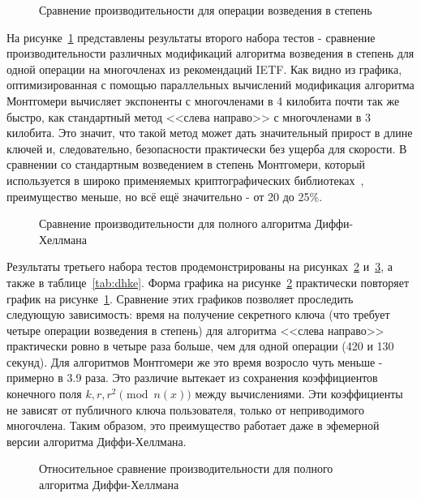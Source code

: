 \documentclass[times,specification,annotation]{itmo-student-thesis}
\begin{document}
\begin{figure}[!h]
\caption{Сравнение производительности для операции возведения в степень}\label{fig:res_bignum}

\end{figure}

На рисунке~\ref{fig:res_bignum} представлены результаты второго набора тестов - сравнение производительности различных
модификаций алгоритма возведения в степень для одной операции на многочленах из рекомендаций IETF.
Как видно из графика, оптимизированная с помощью параллельных вычислений модификация алгоритма Монтгомери
вычисляет экспоненты с многочленами в 4 килобита почти так же быстро, как стандартный метод <<слева направо>> с
многочленами в 3 килобита.
Это значит, что такой метод может дать значительный прирост в длине ключей и, следовательно, безопасности практически
без ущерба для скорости.
В сравнении со стандартным возведением в степень Монтгомери, который используется в широко применяемых
криптографических библиотеках~\cite{openssl}, преимущество меньше, но всё ещё значительно - от 20 до 25\%.

\begin{figure}[!h]
\caption{Сравнение производительности для полного алгоритма Диффи-Хеллмана}\label{fig:res_dhke}

\end{figure}

Результаты третьего набора тестов продемонстрированы на рисунках~\ref{fig:res_dhke} и~\ref{fig:res_dhke_per},
а также в таблице~\ref{tab:dhke}.
Форма графика на рисунке~\ref{fig:res_dhke} практически повторяет график на рисунке~\ref{fig:res_bignum}.
Сравнение этих графиков позволяет проследить следующую зависимость: время на получение секретного ключа (что
требует четыре операции возведения в степень) для алгоритма <<слева направо>> практически ровно в четыре раза
больше, чем для одной операции (420 и 130 секунд).
Для алгоритмов Монтгомери же это время возросло чуть меньше - примерно в 3.9 раза.
Это различие вытекает из сохранения коэффициентов конечного поля $k, r, r^2 \pmod{n(x)}$ между вычислениями.
Эти коэффициенты не зависят от публичного ключа пользователя, только от неприводимого многочлена.
Таким образом, это преимущество работает даже в эфемерной версии алгоритма Диффи-Хеллмана.


\begin{figure}[!h]
\caption{Относительное сравнение производительности для полного алгоритма Диффи-Хеллмана}\label{fig:res_dhke_per}

\end{figure}
\end{document}
